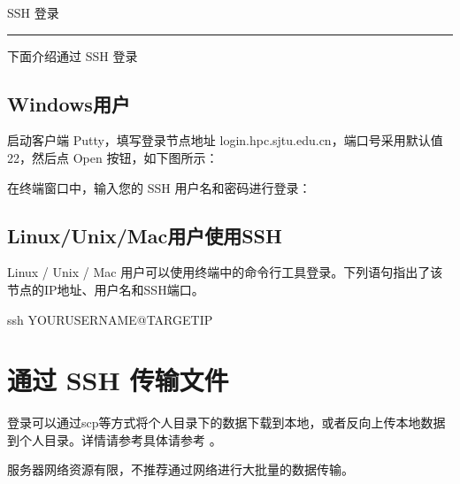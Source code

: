 \documentclass[a4paper,12pt,english]{sphinxmanual}
\begin{document}
\sphinxAtStartPar
SSH 登录


\bigskip\hrule\bigskip


\sphinxAtStartPar
下面介绍通过 SSH 登录


\subsection{Windows用户}
\label{\detokenize{login/index:id5}}
\sphinxAtStartPar
启动客户端 Putty，填写登录节点地址 login.hpc.sjtu.edu.cn，端口号采用默认值 22，然后点 Open 按钮，如下图所示：

\noindent{}

\sphinxAtStartPar
在终端窗口中，输入您的 SSH 用户名和密码进行登录：

\noindent{}

\sphinxAtStartPar
{}


\subsection{Linux/Unix/Mac用户使用SSH}
\label{\detokenize{login/index:linux-unix-macssh}}
\sphinxAtStartPar
Linux / Unix / Mac 用户可以使用终端中的命令行工具登录。下列语句指出了该节点的IP地址、用户名和SSH端口。

\begin{sphinxVerbatim}[commandchars=\\\{\}]
\PYGZdl{} ssh YOUR\PYGZus{}USERNAME@TARGET\PYGZus{}IP
\end{sphinxVerbatim}


\section{通过 SSH 传输文件}
\label{\detokenize{login/index:ssh}}
\sphinxAtStartPar
登录可以通过scp等方式将个人目录下的数据下载到本地，或者反向上传本地数据到个人目录。详情请参考具体请参考 {\hyperref[\detokenize{transport/index:label-transfer}]{}} 。

\sphinxAtStartPar
服务器网络资源有限，不推荐通过网络进行大批量的数据传输。
\end{document}
